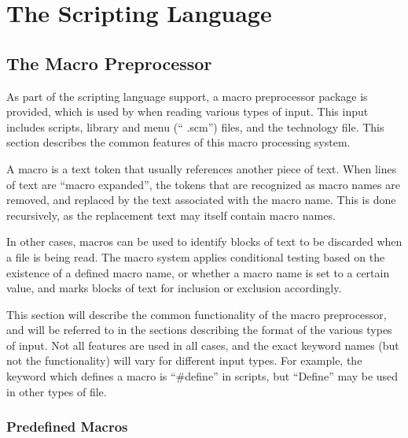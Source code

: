 
\chapter{The {\Xic} Scripting Language}

\section{The Macro Preprocessor}
\label{macro}
As part of the scripting language support, a macro preprocessor
package is provided, which is used by {\Xic} when reading various
types of input.  This input includes scripts, library and menu (``{\vt
.scm}'') files, and the technology file.  This section describes the
common features of this macro processing system.

A macro is a text token that usually references another piece of text. 
When lines of text are ``macro expanded'', the tokens that are
recognized as macro names are removed, and replaced by the text
associated with the macro name.  This is done recursively, as the
replacement text may itself contain macro names.

In other cases, macros can be used to identify blocks of text to be
discarded when a file is being read.  The macro system applies
conditional testing based on the existence of a defined macro name, or
whether a macro name is set to a certain value, and marks blocks of
text for inclusion or exclusion accordingly.

This section will describe the common functionality of the macro
preprocessor, and will be referred to in the sections describing the
format of the various types of input.  Not all features are used in
all cases, and the exact keyword names (but not the functionality)
will vary for different input types.  For example, the keyword which
defines a macro is ``{\vt \#define}'' in scripts, but ``{\vt Define}''
may be used in other types of file.

\subsection{Predefined Macros}


